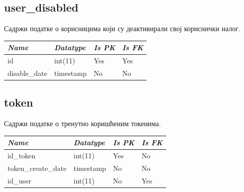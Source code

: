 \subsection{user\_disabled}
Садржи податке о корисницима који су деактивирали свој кориснички налог.

\begin{table}[h!]
\centering
\small

    \begin{tabular}{ | m{} | m{} | m{} | m{} | }
    \hline
        \cellcolor{blue!25}\textbf{\textit{Name}} &

        \cellcolor{blue!25}\textbf{\textit{Datatype}} &
        \cellcolor{blue!25}\textbf{\textit{Is PK}} &
        \cellcolor{blue!25}\textbf{\textit{Is FK}} \\
    \hline
    \hline
        id & int(11) & Yes & Yes \\
    \hline
        disable\_date & timestamp & No & No \\
    \hline
    \end{tabular}

\end{table}

\subsection{token}
Садржи податке о тренутно коришћеним токенима.

\begin{table}[h!]
\centering
\small

    \begin{tabular}{ | m{} | m{} | m{} | m{} | }
    \hline
        \cellcolor{blue!25}\textbf{\textit{Name}} &

        \cellcolor{blue!25}\textbf{\textit{Datatype}} &
        \cellcolor{blue!25}\textbf{\textit{Is PK}} &
        \cellcolor{blue!25}\textbf{\textit{Is FK}} \\
    \hline
    \hline
        id\_token & int(11) & Yes & No \\
    \hline
        token\_create\_date & timestamp & No & No \\
    \hline
        id\_user & int(11) & No & Yes \\
    \hline
    \end{tabular}

\end{table}

